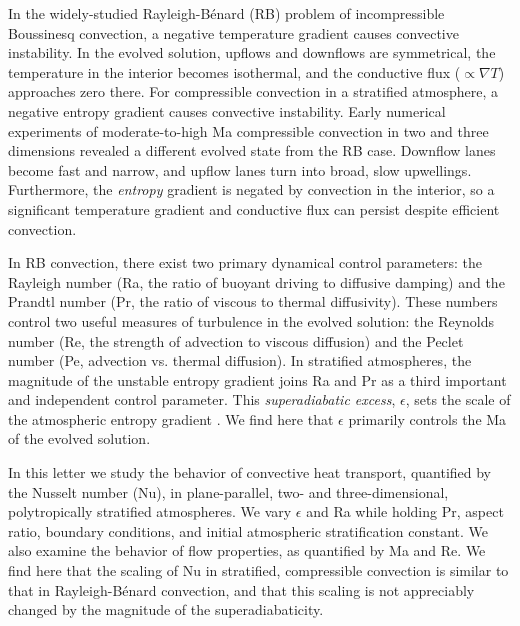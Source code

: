 \documentclass[aps, prl, twocolumn, nofootinbib, groupedaddress, amsfonts, amssymb, amsmath]{revtex4-1}
\newcommand{\grad}{\ensuremath{\nabla}}
\newcommand{\RB}{Rayleigh-B\'{e}nard }
\begin{document}
In the widely-studied \RB (RB) problem of incompressible Boussinesq convection, 
a negative temperature gradient causes convective instability.
In the evolved solution, upflows and downflows are symmetrical, the
temperature in the interior becomes isothermal, and
the conductive flux ($\propto \grad T$) approaches 
zero there. 
For compressible convection in a stratified atmosphere, a
negative entropy gradient causes convective instability.
Early numerical experiments of moderate-to-high Ma compressible convection
in two \cite{graham1975, chan&all1982,
hurlburt&all1984, cattaneo&all1990} and three 
\cite{cattaneo&all1991, brandenburg&all2005, brummell&all1996} dimensions
revealed a different evolved state from the RB case.
Downflow lanes
become fast and narrow, and upflow lanes turn into broad, slow upwellings.
Furthermore, the \emph{entropy} gradient is negated by convection in the interior, so
a significant temperature gradient and conductive flux can persist despite
efficient convection.

In RB convection, there exist two primary dynamical control parameters: 
the Rayleigh number (Ra, the ratio of
buoyant driving to diffusive damping) and the Prandtl number 
(Pr, the ratio of viscous to thermal
diffusivity). These numbers control two useful
measures of turbulence in the evolved solution:
the Reynolds
number (Re, the strength of advection to viscous diffusion)
and the Peclet number (Pe, advection vs. thermal diffusion).  
In stratified atmospheres, the magnitude of the unstable entropy gradient
joins Ra and Pr as a third important and independent control parameter.  This 
\emph{superadiabatic excess}, $\epsilon$,
sets the scale of the atmospheric entropy gradient \cite{graham1975}.
We find here that $\epsilon$ primarily controls the Ma of the evolved solution.

In this letter we study the behavior of convective heat transport, 
quantified by the Nusselt number (Nu), in plane-parallel, 
two- and three-dimensional, polytropically stratified atmospheres.  
We vary $\epsilon$ and Ra while holding Pr, aspect ratio, boundary conditions,
and initial atmospheric stratification
constant.  We also examine the behavior of flow properties, as quantified by Ma and Re.
We find here that the scaling of Nu in stratified, compressible convection 
is similar to that in \RB convection,
and that this scaling is not appreciably changed by the magnitude of the superadiabaticity.
\end{document}
